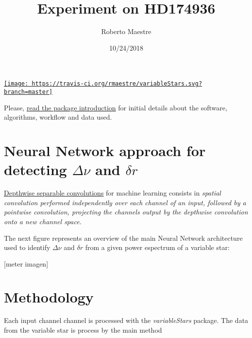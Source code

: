 \documentclass[]{article}
\title{Experiment on HD174936}
\author{Roberto Maestre}
\date{10/24/2018}
\newenvironment{Shaded}{\begin{snugshade}}{\end{snugshade}}
\newcommand{\KeywordTok}[1]{\textcolor[rgb]{0.13,0.29,0.53}{\textbf{#1}}}
\newcommand{\DataTypeTok}[1]{\textcolor[rgb]{0.13,0.29,0.53}{#1}}
\newcommand{\DecValTok}[1]{\textcolor[rgb]{0.00,0.00,0.81}{#1}}
\newcommand{\StringTok}[1]{\textcolor[rgb]{0.31,0.60,0.02}{#1}}
\newcommand{\OtherTok}[1]{\textcolor[rgb]{0.56,0.35,0.01}{#1}}
\newcommand{\OperatorTok}[1]{\textcolor[rgb]{0.81,0.36,0.00}{\textbf{#1}}}
\newcommand{\NormalTok}[1]{#1}
\begin{document}
\maketitle

\href{https://travis-ci.org/rmaestre/variableStars}{\texttt{[image: https://travis-ci.org/rmaestre/variableStars.svg?branch=master]}}

Please,
\href{https://github.com/rmaestre/variableStars/blob/master/README.md}{read
the package introduction} for initial details about the software,
algorithms, workflow and data used.

\section{\texorpdfstring{Neural Network approach for detecting
\(\Delta \nu\) and
\(\delta r\)}{Neural Network approach for detecting \textbackslash{}Delta \textbackslash{}nu and \textbackslash{}delta r}}\label{neural-network-approach-for-detecting-delta-nu-and-delta-r}

\href{https://arxiv.org/pdf/1610.02357.pdf}{Depthwise separable
convolutions} for machine learning consists in \emph{spatial convolution
performed independently over each channel of an input, followed by a
pointwise convolution, projecting the channels output by the depthwise
convolution onto a new channel space. }

The next figure represents an overview of the main Neural Network
architecture used to identify \(\Delta \nu\) and \(\delta r\) from a
given power espectrum of a variable star:

{[}meter imagen{]}

\section{Methodology}\label{methodology}

Each input channel channel is processed with the \emph{variableStars}
package. The data from the variable star is process by the main method

\begin{Shaded}
\end{Shaded}
\end{document}
